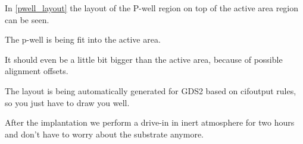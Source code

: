 In \autoref{pwell_layout} the layout of the P-well region on top of the active area region can be seen.

The p-well is being fit into the active area.

It should even be a little bit bigger than the active area, because of possible alignment offsets.

The layout is being automatically generated for GDS2 based on cifoutput rules, so you just have to draw you well.

After the implantation we perform a drive-in in inert atmosphere for two hours and don't have to worry about the substrate anymore.

\newpage

